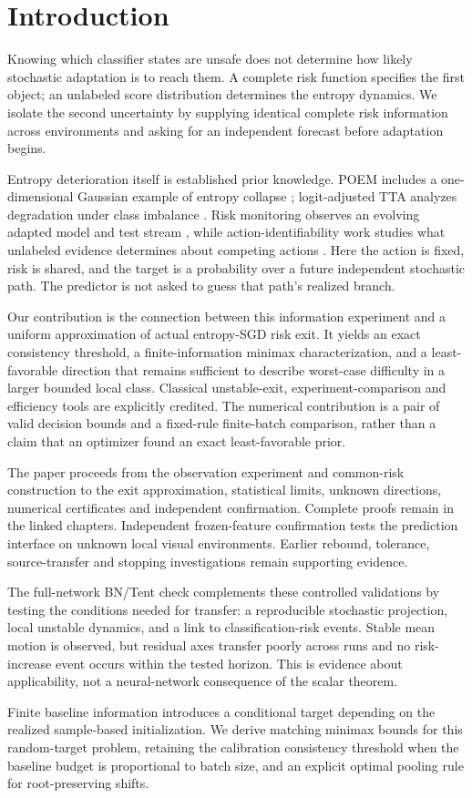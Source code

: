 \section{Introduction}\label{introduction}

Knowing which classifier states are unsafe does not determine how likely stochastic adaptation is to reach them. A complete risk function specifies the first object; an unlabeled score distribution determines the entropy dynamics. We isolate the second uncertainty by supplying identical complete risk information across environments and asking for an independent forecast before adaptation begins.

Entropy deterioration itself is established prior knowledge. POEM includes a one-dimensional Gaussian example of entropy collapse \cite{bar2024poem}; logit-adjusted TTA analyzes degradation under class imbalance \cite{weerasinghe2026}. Risk monitoring observes an evolving adapted model and test stream \cite{schirmer2025}, while action-identifiability work studies what unlabeled evidence determines about competing actions \cite{jhawar2026}. Here the action is fixed, risk is shared, and the target is a probability over a future independent stochastic path. The predictor is not asked to guess that path's realized branch.

Our contribution is the connection between this information experiment and a uniform approximation of actual entropy-SGD risk exit. It yields an exact consistency threshold, a finite-information minimax characterization, and a least-favorable direction that remains sufficient to describe worst-case difficulty in a larger bounded local class. Classical unstable-exit, experiment-comparison and efficiency tools are explicitly credited. The numerical contribution is a pair of valid decision bounds and a fixed-rule finite-batch comparison, rather than a claim that an optimizer found an exact least-favorable prior.

The paper proceeds from the observation experiment and common-risk construction to the exit approximation, statistical limits, unknown directions, numerical certificates and independent confirmation. Complete proofs remain in the linked chapters. Independent frozen-feature confirmation tests the prediction interface on unknown local visual environments. Earlier rebound, tolerance, source-transfer and stopping investigations remain supporting evidence.

The full-network BN/Tent check complements these controlled validations by testing the conditions needed for transfer: a reproducible stochastic projection, local unstable dynamics, and a link to classification-risk events. Stable mean motion is observed, but residual axes transfer poorly across runs and no risk-increase event occurs within the tested horizon. This is evidence about applicability, not a neural-network consequence of the scalar theorem.

Finite baseline information introduces a conditional target depending on the realized sample-based initialization. We derive matching minimax bounds for this random-target problem, retaining the calibration consistency threshold when the baseline budget is proportional to batch size, and an explicit optimal pooling rule for root-preserving shifts.
